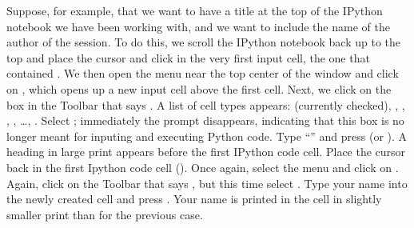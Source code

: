 \documentclass[letterpaper,10pt,english]{sphinxmanual}
\begin{document}
\sphinxAtStartPar
Suppose, for example, that we want to have a title at the top of the IPython notebook we have been working with, and we want to include the name of the author of the session.  To do this, we scroll the IPython notebook back up to the top and place the cursor and click in the very first input cell, the one that contained .  We then open the  menu near the top center of the window and click on , which opens up a new input cell above the first cell.  Next, we click on the box in the Toolbar that says .  A list of cell types appears:  (currently checked), , , , , …, .  Select ; immediately the  prompt disappears, indicating that this box is no longer meant for inputing and executing Python code.  Type “” and press  (or ).  A heading in large print appears before the first IPython code cell.  Place the cursor back in the first Ipython code cell ().  Once again, select the  menu and click on .  Again, click on the Toolbar that says , but this time select .  Type your name into the newly created cell and press .  Your name is printed in the cell in slightly smaller print than for the previous case.
\end{document}
